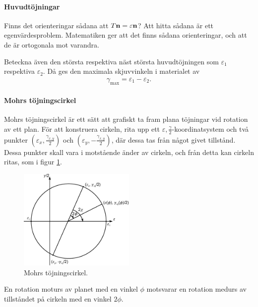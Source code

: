 \paragraph{Huvudtöjningar}
Finns det orienteringar sådana att $T\vb{n} = \varepsilon\vb{n}$? Att hitta sådana är ett egenvärdesproblem. Matematiken ger att det finns sådana orienteringar, och att de är ortogonala mot varandra.

Beteckna även den största respektiva näst största huvudtöjningen som $\varepsilon_{1}$ respektiva $\varepsilon_{2}$. Då ges den maximala skjuvvinkeln i materialet av
\begin{align*}
	\gamma_{\text{max}} = \varepsilon_{1} - \varepsilon_{2}.
\end{align*}

\paragraph{Mohrs töjningscirkel}
Mohrs töjningscirkel är ett sätt att grafiskt ta fram plana töjningar vid rotation av ett plan. För att konstruera cirkeln, rita upp ett $\varepsilon, \frac{\gamma}{2}$-koordinatsystem och två punkter $(\varepsilon_{x}, \frac{\gamma_{x, y}}{2})$ och $(\varepsilon_{y}, -\frac{\gamma_{x, y}}{2})$, där dessa tas från något givet tillstånd. Dessa punkter skall vara i motstående änder av cirkeln, och från detta kan cirkeln ritas, som i figur \ref{fig:mohr_strain_circle}.

\begin{figure}[!ht]
	\centering
	\includegraphics[width = 0.5\textwidth]{./Images/mohr_strain_circle.eps}
	\caption{Mohrs töjningscirkel.}
	\label{fig:mohr_strain_circle}
\end{figure}

En rotation moturs av planet med en vinkel $\phi$ motsvarar en rotation medurs av tillståndet på cirkeln med en vinkel $2\phi$.

